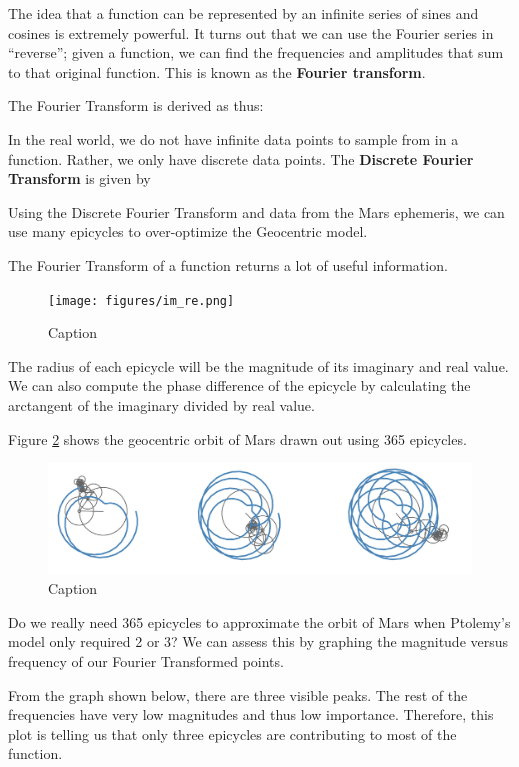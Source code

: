 The idea that a function can be represented by an infinite series of sines and cosines is extremely powerful. It turns out that we can use the Fourier series in ``reverse''; given a function, we can find the frequencies and amplitudes that sum to that original function. This is known as the \textbf{Fourier transform}.  

The Fourier Transform is derived as thus:


In the real world, we do not have infinite data points to sample from in a function. Rather, we only have discrete data points. The \textbf{Discrete Fourier Transform} is given by

Using the Discrete Fourier Transform and data from the Mars ephemeris, we can use many epicycles to over-optimize the Geocentric model. 


The Fourier Transform of a function returns a lot of useful information.

\begin{figure}[H]
    \centering
    \texttt{[image: figures/im\_re.png]}
    \caption{Caption}
    \label{fig:my_label}
\end{figure}



The radius of each epicycle will be the magnitude of its imaginary and real value. We can also compute the phase difference of the epicycle by calculating the arctangent of the imaginary divided by real value. 


Figure \ref{fig:marsProgressive} shows the geocentric orbit of Mars drawn out using 365 epicycles. 

\begin{figure}[H]
    \centering
    \includegraphics[width=\textwidth]{figures/marsprogressive.png}
    \caption{Caption}
    \label{fig:marsProgressive}
\end{figure}

Do we really need 365 epicycles to approximate the orbit of Mars when Ptolemy's model only required 2 or 3? We can assess this by graphing the magnitude versus frequency of our Fourier Transformed points. 

From the graph shown below, there are three visible peaks.  The rest of the frequencies have very low magnitudes and thus low importance. Therefore, this plot is telling us that only three epicycles are contributing to most of the function. 


